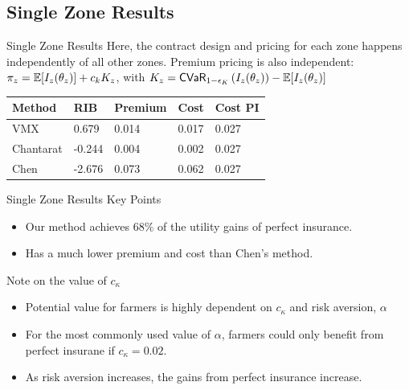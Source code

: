 \documentclass{beamer}
\def\bbe{{\Bbb{E}}}
\def\bbe{{\Bbb{E}}}
\begin{document}
\subsection{Single Zone Results}
\begin{frame}{Single Zone Results}
    Here, the contract design and pricing for each zone happens independently of all other zones. Premium pricing is also independent: $\pi_z = \bbe [I_z(\theta_z)]+c_k K_z$, with $K_z = {\sf CVaR}_{1-\epsilon_K}\left ( I_z(\theta_z)\right )  - \mathbb{E}[I_z(\theta_z)] $
    \begin{table}[]
        \centering
        \begin{tabular}{lllll}
        \textbf{Method} & \textbf{RIB} & \textbf{Premium} & \textbf{Cost} & \textbf{Cost PI} \\ \hline
        VMX             & 0.679        & 0.014            & 0.017         & 0.027            \\
        Chantarat       & -0.244       & 0.004            & 0.002         & 0.027            \\
        Chen            & -2.676       & 0.073            & 0.062         & 0.027           
        \end{tabular}
        \end{table}
    
\end{frame}

\begin{frame}{Single Zone Results Key Points}
    \begin{itemize}
        \setlength\itemsep{2em}
        \item Our method achieves $68\%$ of the utility gains of perfect insurance. 
        \item Has a much lower premium and cost than Chen's method. 
    \end{itemize}
\end{frame}

\begin{frame}{Note on the value of $c_{\kappa}$}
    \begin{itemize}
        \setlength\itemsep{2em}
        \item Potential value for farmers is highly dependent on $c_{\kappa}$ and risk aversion, $\alpha$
        \item For the most commonly used value of $\alpha$, farmers could only benefit from perfect insurane if $c_{\kappa}=0.02$.
        \item As risk aversion increases, the gains from perfect insurance increase. 
    \end{itemize}
\end{frame}
\end{document}
